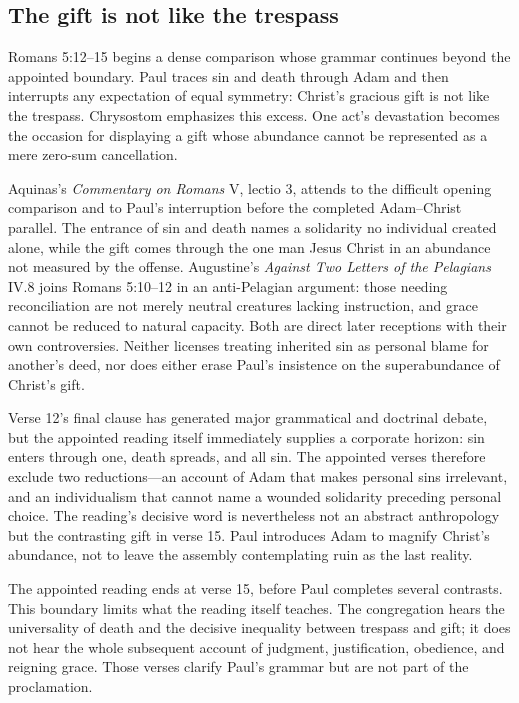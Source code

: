 \subsection*{The gift is not like the trespass\enspace{}}

Romans 5:12--15 begins a dense comparison whose grammar continues beyond the appointed boundary. Paul traces sin and death through Adam and then interrupts any expectation of equal symmetry: Christ's gracious gift is not like the trespass. Chrysostom emphasizes this excess. One act's devastation becomes the occasion for displaying a gift whose abundance cannot be represented as a mere zero-sum cancellation.

Aquinas's \emph{Commentary on Romans} V, lectio 3, attends to the difficult opening comparison and to Paul's interruption before the completed Adam--Christ parallel. The entrance of sin and death names a solidarity no individual created alone, while the gift comes through the one man Jesus Christ in an abundance not measured by the offense. Augustine's \emph{Against Two Letters of the Pelagians} IV.8 joins Romans 5:10--12 in an anti-Pelagian argument: those needing reconciliation are not merely neutral creatures lacking instruction, and grace cannot be reduced to natural capacity. Both are direct later receptions with their own controversies. Neither licenses treating inherited sin as personal blame for another's deed, nor does either erase Paul's insistence on the superabundance of Christ's gift.

Verse 12's final clause has generated major grammatical and doctrinal debate, but the appointed reading itself immediately supplies a corporate horizon: sin enters through one, death spreads, and all sin. The appointed verses therefore exclude two reductions---an account of Adam that makes personal sins irrelevant, and an individualism that cannot name a wounded solidarity preceding personal choice. The reading's decisive word is nevertheless not an abstract anthropology but the contrasting gift in verse 15. Paul introduces Adam to magnify Christ's abundance, not to leave the assembly contemplating ruin as the last reality.

The appointed reading ends at verse 15, before Paul completes several contrasts. This boundary limits what the reading itself teaches. The congregation hears the universality of death and the decisive inequality between trespass and gift; it does not hear the whole subsequent account of judgment, justification, obedience, and reigning grace. Those verses clarify Paul's grammar but are not part of the proclamation.


